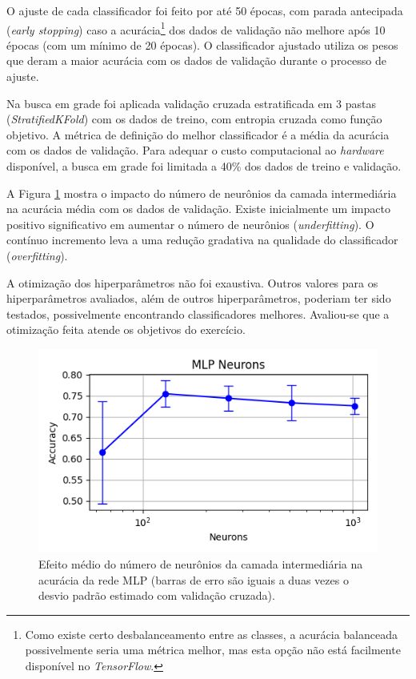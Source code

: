 \documentclass[final,5p]{elsarticle}
\numberwithin{equation}{section}
\begin{document}
    O ajuste de cada classificador foi feito por até 50 épocas, com parada antecipada (\emph{early stopping}) caso a acurácia\footnote{Como existe certo desbalanceamento entre as classes, a acurácia balanceada possivelmente seria uma métrica melhor, mas esta opção não está facilmente disponível no \emph{TensorFlow}.} dos dados de validação não melhore após 10 épocas (com um mínimo de 20 épocas). O classificador ajustado utiliza os pesos que deram a maior acurácia com os dados de validação durante o processo de ajuste.

    Na busca em grade foi aplicada validação cruzada estratificada em 3 pastas (\emph{StratifiedKFold}) com os dados de treino, com entropia cruzada como função objetivo. A métrica de definição do melhor classificador é a média da acurácia com os dados de validação. Para adequar o custo computacional ao \emph{hardware} disponível, a busca em grade foi limitada a 40\% dos dados de treino e validação.

    A Figura \ref{fig:NeuroniosMLP} mostra o impacto do número de neurônios da camada intermediária na acurácia média com os dados de validação. Existe inicialmente um impacto positivo significativo em aumentar o número de neurônios (\emph{underfitting}). O contínuo incremento leva a uma redução gradativa na qualidade do classificador (\emph{overfitting}).

    A otimização dos hiperparâmetros não foi exaustiva. Outros valores para os hiperparâmetros avaliados, além de outros hiperparâmetros, poderiam ter sido testados, possivelmente encontrando classificadores melhores. Avaliou-se que a otimização feita atende os objetivos do exercício.

     \begin{figure}[hbt!]
         \includegraphics[width=0.95\columnwidth]{MLP_neurons.png}
         \caption{Efeito médio do número de neurônios da camada intermediária na acurácia da rede MLP (barras de erro são iguais a duas vezes o desvio padrão estimado com validação cruzada).}\label{fig:NeuroniosMLP}
     \end{figure}
\end{document}
